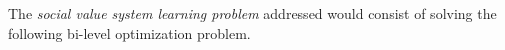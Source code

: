 \documentclass{ecai}
\begin{document}

The \textit{social value system learning problem} addressed would consist of solving the following bi-level optimization problem.
\end{document}
